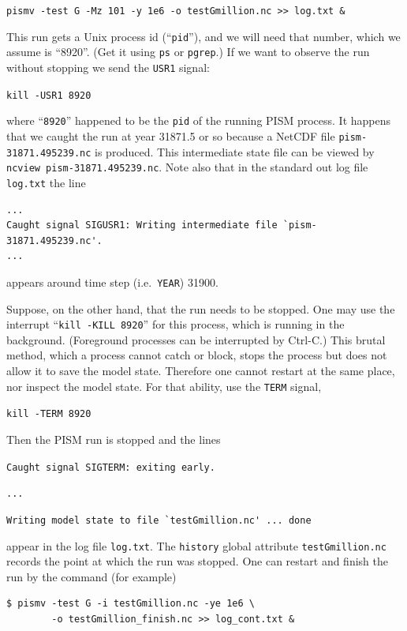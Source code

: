 \documentclass[11pt,final]{amsart}
\begin{document}
\verb|pismv -test G -Mz 101 -y 1e6 -o testGmillion.nc >> log.txt &|

\noindent This run gets a Unix process id (``\verb|pid|''), and we will need that number, which we assume is ``8920''.  (Get it using \verb|ps| or \verb|pgrep|.)  If we want to observe the run without stopping we send the \verb|USR1| signal:

\verb|kill -USR1 8920|

\noindent where ``\verb|8920|'' happened to be the \verb|pid| of the running PISM process.  It happens that we caught the run at year 31871.5 or so because a NetCDF file \verb|pism-31871.495239.nc| is produced.  This intermediate state file can be viewed by \verb|ncview pism-31871.495239.nc|.  Note also that in the standard out log file \verb|log.txt| the line

\begin{verbatim}
...
Caught signal SIGUSR1: Writing intermediate file `pism-31871.495239.nc'.
...
\end{verbatim}
\noindent appears around time step (i.e.~\verb|YEAR|) 31900.

Suppose, on the other hand, that the run needs to be stopped.  One may use the interrupt ``\verb|kill -KILL 8920|'' for this process, which is running in the background.  (Foreground processes can be interrupted by Ctrl-C.)  This brutal method, which a process cannot catch or block, stops the process but does not allow it to save the model state.  Therefore one cannot restart at the same place, nor inspect the model state.  For that ability, use the \verb|TERM| signal,

\verb|kill -TERM 8920|

\noindent Then the PISM run is stopped and the lines

\verb|Caught signal SIGTERM: exiting early.|

\verb|...|

\verb|Writing model state to file `testGmillion.nc' ... done|

\noindent appear in the log file \verb|log.txt|.  The \verb|history| global attribute \verb|testGmillion.nc| records the point at which the run was stopped.  One can restart and finish the run by the command (for example)

\begin{verbatim}
$ pismv -test G -i testGmillion.nc -ye 1e6 \
        -o testGmillion_finish.nc >> log_cont.txt &
\end{verbatim}
\end{document}
